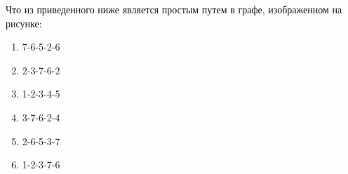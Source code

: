 
Что из приведенного ниже является простым путем в графе, изображенном на рисунке:


\begin{enumerate}
    \item 7-6-5-2-6
    \item 2-3-7-6-2
    \item 1-2-3-4-5
    \item 3-7-6-2-4
    \item 2-6-5-3-7
    \item 1-2-3-7-6
\end{enumerate}